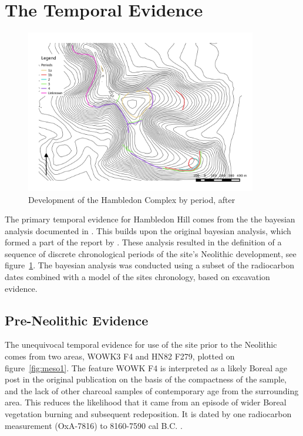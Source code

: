 \section{The Temporal Evidence}

\begin{figure}
\begin{center}
	\includegraphics[width=0.9\textwidth]{figures/periods}
\end{center}
  \caption{Development of the Hambledon Complex by period, after \cite{Mercer:2008fk}}
  \label{fig:periods}
\end{figure}

The primary temporal evidence for Hambledon Hill comes from the the bayesian analysis documented in \citet{Whittle:2011kl}. This builds upon the original bayesian analysis, which formed a part of the report by \citet{Mercer:2008fk}. These analysis resulted in the definition of a sequence of discrete chronological periods of the site's Neolithic development, see figure~\ref{fig:periods}. The bayesian analysis was conducted using a subset of the radiocarbon dates combined with a model of the sites chronology, based on excavation evidence. 

\subsection{Pre-Neolithic Evidence}
The unequivocal temporal evidence for use of the site prior to the Neolithic comes from two areas, WOWK3 F4 and HN82 F279, plotted on figure~\ref{fig:meso1}. The feature WOWK F4 is interpreted as a likely Boreal age post in the original publication \citep[46]{Mercer:2008fk} on the basis of the compactness of the sample, and the lack of other charcoal samples of contemporary age from the surrounding area. This reduces the likelihood that it came from an episode of wider Boreal vegetation burning and subsequent redeposition. It is dated by one radiocarbon measurement (OxA-7816) to 8160-7590 cal B.C. \citep[43]{Mercer:2008fk}. 

